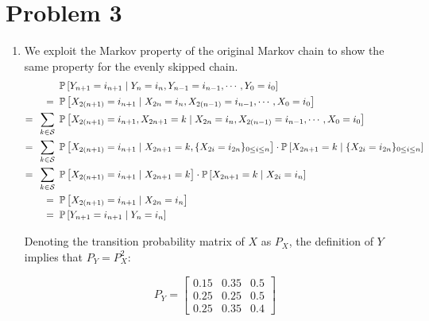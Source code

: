 \documentclass[12pt]{article}%
\begin{document}
\section{Problem 3}%
\label{sec:problem-3}

\begin{enumerate}
  \item We exploit the Markov property of the original Markov chain to show the same property for the evenly skipped chain.
      \begin{align*}
        & \mathbb{P}\left[Y_{n+1} = i_{n+1} \mid Y_{n} = i_n, Y_{n-1} = i_{n-1}, \cdots, Y_0 = i_{0}\right] \\
      = \phantom{,} & \mathbb{P}\left[X_{2(n+1)} = i_{n+1} \mid X_{2n} = i_n, X_{2(n-1)} = i_{n-1}, \cdots, X_0 = i_{0}\right] \\
        = \phantom{,}  \sum_{k \in \mathcal{S}} \phantom{,} & \mathbb{P}\left[X_{2(n+1)} = i_{n+1}, X_{2n+1} = k \mid X_{2n} = i_n, X_{2(n-1)} = i_{n-1}, \cdots, X_0 = i_{0}\right] \\
        = \phantom{,}  \sum_{k \in \mathcal{S}} \phantom{,} & \mathbb{P}\left[X_{{2(n+1)}} = i_{n+1} \mid X_{2n + 1} = k, \{X_{2i} = i_{2n}\}_{0 \leq i \leq n}\right] \cdot \mathbb{P}\left[X_{2n + 1} = k \mid  \{X_{2i} = i_{2n}\}_{0 \leq i \leq n}\right] \\
        = \phantom{,}  \sum_{k \in \mathcal{S}} \phantom{,} & \mathbb{P}\left[X_{{2(n+1)}} = i_{n+1} \mid X_{2n + 1} = k\right] \cdot \mathbb{P}\left[X_{2n + 1} = k \mid X_{2i} = i_n\right] \\
        = \phantom{,} & \mathbb{P}\left[X_{{2(n+1)}} = i_{n+1} \mid X_{2n} = i_{n}\right] \\
        = \phantom{,} & \mathbb{P}\left[Y_{n+1} = i_{n+1} \mid Y_{n} = i_{n}\right]
      \end{align*}

        Denoting the transition probability matrix of $X$ as $P_{X}$, the definition of $Y$ implies that $P_{Y} = P_{X}^{2}$:

        \[P_{Y} = \begin{bmatrix}
                    0.15 & 0.35 & 0.5 \\
                    0.25 & 0.25 & 0.5 \\
                    0.25 & 0.35 & 0.4
                  \end{bmatrix}\]


\end{enumerate}
\end{document}

